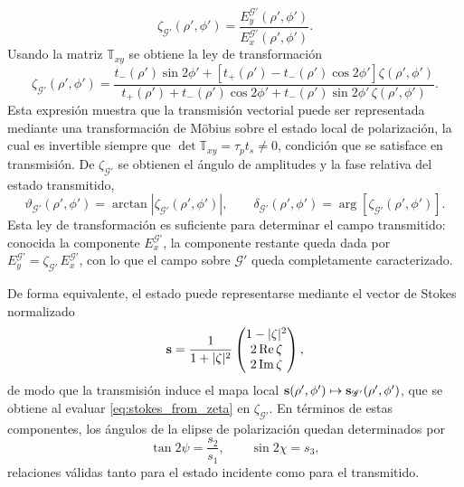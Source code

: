 \begin{equation}
\zeta_{\mathscr{G}'}(\rho',\phi')
=
\frac{E_y^{\mathscr{G}'}(\rho',\phi')}{E_x^{\mathscr{G}'}(\rho',\phi')}.
\label{eq:zeta_Gp_def}
\end{equation}
Usando la matriz $\mathbb{T}_{xy}$ se obtiene la ley de transformación
\begin{equation}
\boxed{
\zeta_{\mathscr{G}'}(\rho',\phi')
=
\frac{
t_-(\rho')\sin 2\phi'
+
\left[t_+(\rho') - t_-(\rho')\cos 2\phi'\right]\zeta(\rho',\phi')
}{
t_+(\rho') + t_-(\rho')\cos 2\phi'
+
t_-(\rho')\sin 2\phi'\,\zeta(\rho',\phi')
}.
}
\label{eq:mobius_transformation}
\end{equation}
Esta expresión muestra que la transmisión vectorial puede ser representada 
mediante una transformación de Möbius sobre el estado local de polarización, la cual es invertible siempre
que $\det \mathbb{T}_{xy}=\tau_p t_s \neq 0$, condición que se satisface en
transmisión. De $\zeta_{\mathscr{G}'}$ se obtienen el ángulo de amplitudes y
la fase relativa del estado transmitido,
\begin{equation}
\vartheta_{\mathscr{G}'}(\rho',\phi')
=
\arctan \left|\zeta_{\mathscr{G}'}(\rho',\phi')\right|,
\qquad
\delta_{\mathscr{G}'}(\rho',\phi')
=
\arg \left[\zeta_{\mathscr{G}'}(\rho',\phi')\right].
\label{eq:jones_params_transmitted}
\end{equation}
Esta ley de transformación es suficiente para determinar el campo transmitido:
conocida la componente $E_x^{\mathscr{G}'}$, la componente restante queda dada
por $E_y^{\mathscr{G}'}=\zeta_{\mathscr{G}'}\,E_x^{\mathscr{G}'}$, con lo que
el campo sobre $\mathscr{G}'$ queda completamente caracterizado.

De forma equivalente, el estado puede representarse mediante el vector de
Stokes normalizado
\begin{equation}
\vb s
=
\frac{1}{1+|\zeta|^2}
\begin{pmatrix}
1-|\zeta|^2 \\
2\operatorname{Re}\zeta \\
2\operatorname{Im}\zeta
\end{pmatrix},
\label{eq:stokes_from_zeta}
\end{equation}
de modo que la transmisión induce el mapa local
$\vb s(\rho',\phi') \mapsto \vb s_{\mathscr{G}'}(\rho',\phi')$, que se obtiene
al evaluar \eqref{eq:stokes_from_zeta} en $\zeta_{\mathscr{G}'}$. En términos
de estas componentes, los ángulos de la elipse de polarización quedan
determinados por
\begin{equation}
\tan 2\psi = \frac{s_2}{s_1},
\qquad
\sin 2\chi = s_3,
\label{eq:psi_chi_from_stokes}
\end{equation}
relaciones válidas tanto para el estado incidente como para el transmitido.

